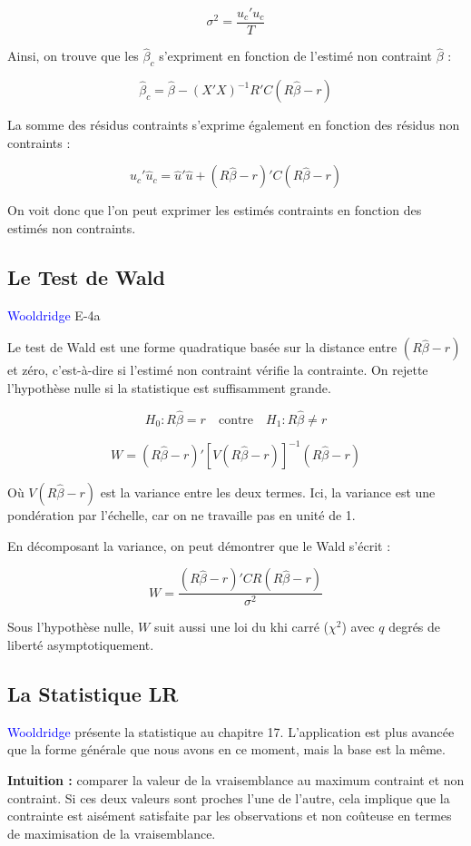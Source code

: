 \documentclass[14pt]{extarticle} %
\theoremstyle{definition}
\theoremstyle{plain}
\newcommand{\livre}[1]{\textcolor{blue}{#1}}
\begin{document}
\[
\sigma^2 = \frac{u_c'u_c}{T}
\]

Ainsi, on trouve que les $\hat{\beta}_c$ s’expriment en fonction de l’estimé non contraint $\hat{\beta}$ :

\[
\hat{\beta}_c = \hat{\beta} - (X'X)^{-1}R'C(R\hat{\beta} - r)
\]

La somme des résidus contraints s'exprime également en fonction des résidus non contraints :

\[
\hat{u}_c'\hat{u}_c = \hat{u}'\hat{u} + (R\hat{\beta} - r)'C(R\hat{\beta} - r)
\]

On voit donc que l’on peut exprimer les estimés contraints en fonction des estimés non contraints.

\subsection{Le Test de Wald}

\livre{Wooldridge} E-4a

Le test de Wald est une forme quadratique basée sur la distance entre $(R\hat{\beta} - r)$ et zéro, c’est-à-dire si l’estimé non contraint vérifie la contrainte. On rejette l’hypothèse nulle si la statistique est suffisamment grande.

\[
H_0: R\hat{\beta} = r \quad \text{contre} \quad H_1: R\hat{\beta} \neq r
\]

\[
W = (R\hat{\beta} - r)' [V(R\hat{\beta} - r)]^{-1} (R\hat{\beta} - r)
\]

Où $V(R\hat{\beta} - r)$ est la variance entre les deux termes. Ici, la variance est une pondération par l’échelle, car on ne travaille pas en unité de 1.

En décomposant la variance, on peut démontrer que le Wald s’écrit :

\[
W = \frac{(R\hat{\beta} - r)'CR(R\hat{\beta} - r)}{\sigma^2}
\]

Sous l’hypothèse nulle, $W$ suit aussi une loi du khi carré ($\chi^2$) avec $q$ degrés de liberté asymptotiquement.

\subsection{La Statistique LR}

\livre{Wooldridge} présente la statistique au chapitre 17. L’application est plus avancée que la forme générale que nous avons en ce moment, mais la base est la même.

\textbf{Intuition :} comparer la valeur de la vraisemblance au maximum contraint et non contraint. Si ces deux valeurs sont proches l’une de l’autre, cela implique que la contrainte est aisément satisfaite par les observations et non coûteuse en termes de maximisation de la vraisemblance.
\end{document}
